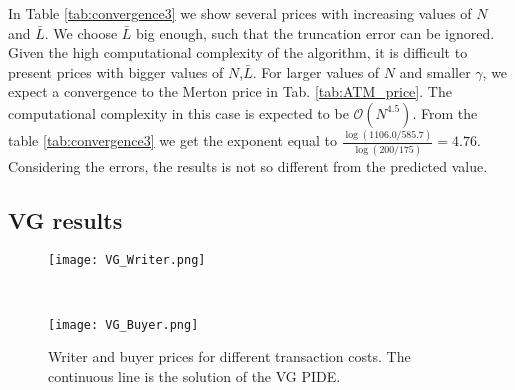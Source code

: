 In Table \ref{tab:convergence3} we show several prices with increasing values of $N$ and $\bar L$. We choose $\bar L$ big enough, such that the truncation error can be ignored.
Given the high computational complexity of the algorithm, 
it is difficult to present prices with bigger values of $N$,$\bar L$. For larger values of $N$ and smaller $\gamma$, we expect a convergence to the Merton price in Tab. 
\ref{tab:ATM_price}. 
The computational complexity in this case is expected to be $\mathcal{O}(N^{4.5})$. From the table \ref{tab:convergence3} we get 
the exponent equal to $\frac{\log(1106.0/585.7)}{\log(200/175)} = 4.76$. Considering the errors, the results is not so different from the predicted value.

\subsection{VG results}\label{num_sec_VG}

\begin{figure}[t!]
 \begin{minipage}[b]{0.5\linewidth}
   \centering
   \texttt{[image: VG\_Writer.png]}
 \end{minipage}
 \ \hspace{2mm} \hspace{3mm} \
 \begin{minipage}[b]{0.5\linewidth}
   \texttt{[image: VG\_Buyer.png]}
 \end{minipage}
 \caption{Writer and buyer prices for different transaction costs. The continuous line is the solution of the VG PIDE.}
 \label{Fig8}
\end{figure}  

